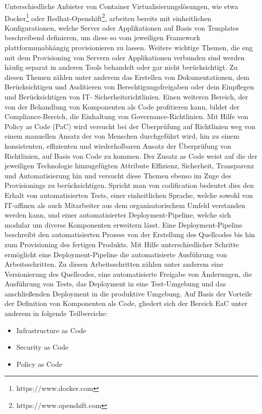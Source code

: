 \bigbreak
Unterschiedliche Anbieter von Container Virtualisierungslösungen, wie etwa Docker\footnote{https://www.docker.com} oder Redhat-Openshift\footnote{https://www.openshift.com}, arbeiten bereits mit einheitlichen Konfigurationen, welche Server oder Applikationen auf Basis von Templates beschreibend definieren, um diese so vom jeweiligen Framework plattformunabhängig provisionieren zu lassen. Weitere wichtige Themen, die eng mit dem Provisioning von Servern oder Applikationen verbunden sind werden häufig separat in anderen Tools behandelt oder gar nicht berücksichtigt. Zu diesen Themen zählen unter anderem das Erstellen von Dokumentationen, dem Berücksichtigen und Auditieren von Berechtigungsfreigaben oder dem Einpflegen und Berücksichtigen von IT- Sicherheitsrichtlinien.
\bigbreak
Einen weiteren Bereich, der von der Behandlung von Komponenten als Code profitieren kann, bildet der Compliance-Bereich, die Einhaltung von Governance-Richtlinien. Mit Hilfe von \glqq{}Policy as Code\grqq{} (PaC) wird versucht bei der Überprüfung auf Richtlinien weg von einem manuellen Ansatz der von Menschen durchgeführt wird, hin zu einem konsistenten, effizienten und wiederholbaren Ansatz der Überprüfung von Richtlinien, auf Basis von Code zu kommen. \autocite{hashicorp_policyascode}
\bigbreak
Der Zusatz \glqq{}as Code\grqq{} weist auf die der jeweiligen Technologie hinzugefügten Attribute Effizienz, Sicherheit, Transparenz und Automatisierung hin und versucht diese Themen ebenso im Zuge des Provisionings zu berücksichtigen. Spricht man von \glqq{}codification\grqq{} bedeutet dies den Erhalt von automatisierten Tests, einer einheitlichen Sprache, welche sowohl von IT-affinen als auch Mitarbeiter aus dem organisatorischem Umfeld verstanden werden kann, und einer automatisierter Deployment-Pipeline, welche sich modular um diverse Komponenten erweitern lässt. Eine Deployment-Pipeline beschreibt den automatisierten Prozess von der Erstellung des Quellcodes bis hin zum Provisioning des fertigen Produkts. Mit Hilfe unterschiedlicher Schritte ermöglicht eine Deployment-Pipeline die automatisierte Ausführung von Arbeitsschritten. Zu diesen Arbeitsschritten zählen unter anderem eine Versionierung des Quellcodes, eine automatisierte Freigabe von Änderungen, die Ausführung von Tests, das Deployment in eine Test-Umgebung und das anschließenden Deployment in die produktive Umgebung. \autocite{könig_kugel_2019}
\bigbreak
Auf Basis der Vorteile der Definition von Komponenten als Code, gliedert sich der Bereich EaC unter anderem in folgende Teilbereiche:
\begin{itemize}
    \item Infrastructure as Code
    \item Security as Code
    \item Policy as Code
\end{itemize}
